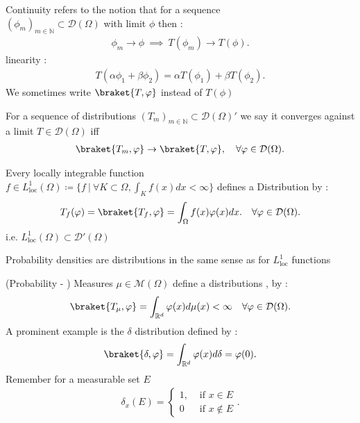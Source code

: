 \begin{remark}
  Continuity  refers to the notion that for a sequence \\  $(\phi_m)_{m \in  \mathbb{N}} \subset  \mathcal{D}(\Omega )$  with limit $\phi $ then : 
  \begin{align*}
    \phi_m \to \phi  \ \implies \ T(\phi_m) \to  T(\phi )
  .\end{align*}
  linearity : 
  \begin{align*}
    T(\alpha \phi_1 + \beta \phi_2) = \alpha T(\phi_1) + \beta T(\phi_2)
  .\end{align*}
  We sometimes write $\braket{T,\phi}$ instead of $T(\phi )$
\end{remark}
\begin{definition}[Convergence]
  For a sequence of distributions $(T_m)_{m \in  \mathbb{N}} \subset  \mathcal{D}(\Omega )'$  we say it converges against a limit $T \in \mathcal{D}(\Omega)$  iff 
  \begin{align*}
    \braket{T_m,\phi } \to  \braket{T,\phi } , \quad \forall \phi  \in  \mathcal{D}(\Omega )
  .\end{align*}
\end{definition}
\begin{example}
  Every locally integrable function $ f \in  L_{\text{loc}}^{1}(\Omega ) \coloneqq  \{f \ | \ \forall K \subset  \Omega , \int_K f(x) dx < \infty \}  $  defines a Distribution by    : 
  \begin{align*}
    T_f(\phi )  = \braket{T_f,\phi } = \int_\Omega f(x) \phi(x) dx . \quad \forall \phi \in \mathcal{D}(\Omega)
  .\end{align*}
  i.e. $L_{\text{loc}}^{1}(\Omega ) \subset  \mathcal{D}'(\Omega ) $
\end{example}
\begin{example}
  Probability densities are distributions in the same sense as for $L_{\text{loc}}^{1} $ functions
\end{example}
\begin{example}
  (Probability - ) Measures $ \mu  \in  \mathcal{M}(\Omega )$ define  a distributions , by : 
  \begin{align*}
    \braket{T_\mu ,\phi } = \int_{\mathbb{R}^{d} } \phi(x) d\mu(x) < \infty \quad \forall \phi \in \mathcal{D}(\Omega)
  .\end{align*}
  A prominent example is the $\delta $ distribution defined by : 
  \begin{align*}
    \braket{\delta ,\phi } = \int_{\mathbb{R}^{d} } \phi(x) d \delta   = \phi(0)
  .\end{align*}
   Remember for a measurable set $E$ 
   \begin{align*}
    \delta_x(E) = \begin{cases}
      1, &\text{ if }x \in  E \\
      0  &\text{ if }x \not\in E
    \end{cases}
   .\end{align*}
\end{example}
